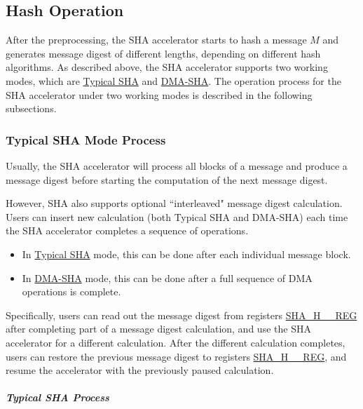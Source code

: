\documentclass[main\_\_EN.tex]{subfiles}
\begin{document}
\subsection{Hash Operation}\label{sec:sha-hash-operation}

After the preprocessing, the \chipname{} SHA accelerator starts to hash a message \begin{math}M\end{math} and generates message digest of different lengths, depending on different hash algorithms. As described above, the \chipname{} SHA accelerator supports two working modes, which are \hyperref[sec:sha-typical-sha]{Typical SHA} and \hyperref[sec:sha-dma-sha]{DMA-SHA}. The
operation process for the SHA accelerator under two working modes is described in the following subsections.

\subsubsection{Typical SHA Mode Process}\label{sec:sha-typical-sha}

Usually, the SHA accelerator will process all blocks of a message and produce a message digest before starting the computation of the next message digest.

However, \chipname{} SHA also supports optional ``interleaved" message digest calculation. Users can insert new calculation (both Typical SHA and DMA-SHA) each time the SHA accelerator completes a sequence of operations.
\begin{itemize}
    \item In \hyperref[sec:sha-typical-sha]{Typical SHA} mode, this can be done after each individual message block. 
    \item In \hyperref[sec:sha-dma-sha]{DMA-SHA} mode, this can be done after a full sequence of DMA operations is complete.
\end{itemize} 

Specifically, users can read out the message digest from  registers \hyperref[regdesc:SHAHNREG]{SHA\_H\_\_REG} after completing part of a message digest calculation, and use the SHA accelerator for a different calculation. After the different calculation completes, users can restore the previous message digest to registers \hyperref[regdesc:SHAHNREG]{SHA\_H\_\_REG}, and resume the accelerator with the previously paused calculation.

\subparagraph{Typical SHA Process}
\end{document}
